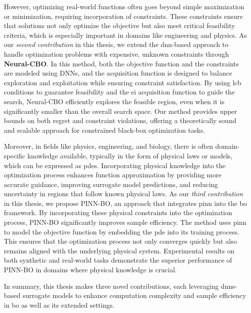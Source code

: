 However, optimizing real-world functions often goes beyond simple maximization or minimization, requiring incorporation of constraints. These constraints ensure that solutions not only optimize the objective but also meet critical feasibility criteria, which is especially important in domains like engineering and physics. As our \emph{second contribution} in this thesis, we extend the \ac{dnn}-based approach to handle optimization problems with expensive, unknown constraints through \textbf{Neural-CBO}. In this method, both the objective function and the constraints are modeled using DNNs, and the acquisition function is designed to balance exploration and exploitation while ensuring constraint satisfaction. By using \ac{lcb} conditions to guarantee feasibility and the \ac{ei} acquisition function to guide the search, Neural-CBO efficiently explores the feasible region, even when it is significantly smaller than the overall search space. Our method provides upper bounds on both regret and constraint violations, offering a theoretically sound and scalable approach for constrained black-box optimization tasks.

Moreover, in fields like physics, engineering, and biology, there is often domain-specific knowledge available, typically in the form of physical laws or models, which can be expressed as \acp{pde}. Incorporating physical knowledge into the optimization process enhances function approximation by providing more accurate guidance, improving surrogate model predictions, and reducing uncertainty in regions that follow known physical laws. As our \emph{third contribution} in this thesis, we propose PINN-BO, an approach that integrates \ac{pinn} into the \ac{bo} framework.  By incorporating these physical constraints into the optimization process, PINN-BO significantly improves sample efficiency. The method uses \ac{pinn} to model the objective function by embedding the \ac{pde} into its training process. This ensures that the optimization process not only converges quickly but also remains aligned with the underlying physical system. Experimental results on both synthetic and real-world tasks demonstrate the superior performance of PINN-BO in domains where physical knowledge is crucial. 

In summary, this thesis makes three novel contributions, each leveraging \acp{dnn}-based surrogate models to enhance computation complexity and sample efficiency in \ac{bo} as well as its extended settings.


